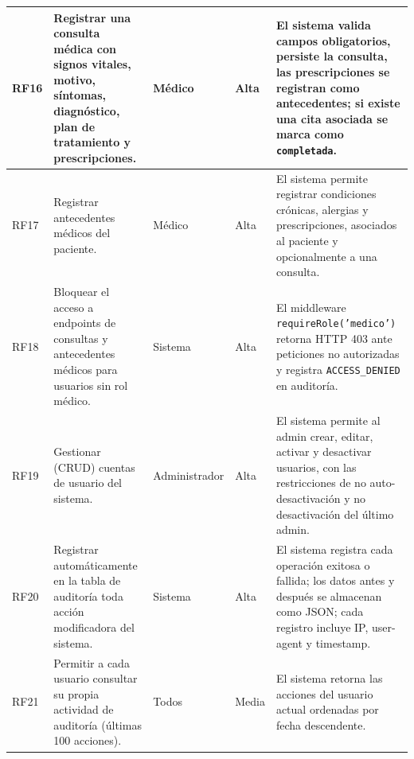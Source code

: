 \documentclass[11pt,a4paper]{article}
\begin{document}
\begin{longtable}{|C{1cm}|L{5cm}|L{2.5cm}|C{1cm}|L{4cm}|}
    RF16        & Registrar una consulta médica con signos vitales, motivo, síntomas, diagnóstico, plan de tratamiento y prescripciones. & Médico                         & Alta            & El sistema valida campos obligatorios, persiste la consulta, las prescripciones se registran como antecedentes; si existe una cita asociada se marca como \texttt{completada}.                                             \\
    \hline

    RF17        & Registrar antecedentes médicos del paciente.                                                                           & Médico                         & Alta            & El sistema permite registrar condiciones crónicas, alergias y prescripciones, asociados al paciente y opcionalmente a una consulta.                                                                                        \\
    \hline

    RF18        & Bloquear el acceso a endpoints de consultas y antecedentes médicos para usuarios sin rol médico.                       & Sistema                        & Alta            & El middleware \texttt{requireRole('medico')} retorna HTTP 403 ante peticiones no autorizadas y registra \texttt{ACCESS\_DENIED} en auditoría.                                                                              \\
    \hline

    RF19        & Gestionar (CRUD) cuentas de usuario del sistema.                                                                       & Administrador                  & Alta            & El sistema permite al admin crear, editar, activar y desactivar usuarios, con las restricciones de no auto-desactivación y no desactivación del último admin.                                                              \\
    \hline

    RF20        & Registrar automáticamente en la tabla de auditoría toda acción modificadora del sistema.                               & Sistema                        & Alta            & El sistema registra cada operación exitosa o fallida; los datos antes y después se almacenan como JSON; cada registro incluye IP, user-agent y timestamp.                                                                  \\
    \hline

    RF21        & Permitir a cada usuario consultar su propia actividad de auditoría (últimas 100 acciones).                             & Todos                          & Media           & El sistema retorna las acciones del usuario actual ordenadas por fecha descendente.                                                                                                                                        \\
    \hline


\end{longtable}
\end{document}
